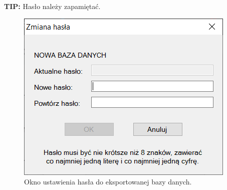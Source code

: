 \textbf{TIP:} Hasło należy zapamiętać.

\begin{figure}[htb]
	\centering
	\includegraphics{obrazki/Ustawienia/zmiana_hasla_bazy.PNG}
	\caption{Okno ustawienia hasła do eksportowanej bazy danych.}
	\label{zmianaHaslaBazyEksportowanej}
\end{figure}